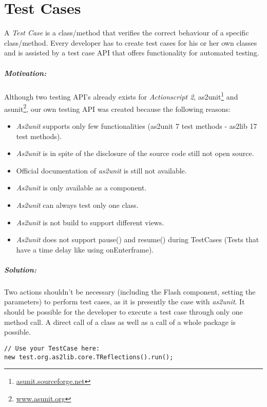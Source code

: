 \chapter{Test Cases}
\label{sec:TestCases}

A \emph{Test Case} is a class/method that verifies the correct behaviour of a specific class/method. Every developer has to create test cases for his or her own classes and is assisted by a test case API that offers functionality for automated testing.

\paragraph{Motivation:}
Although two testing API's already exists for {\sl Actionscript 2}, as2unit\footnote{\href{http://www.as2unit.org}{asunit.sourceforge.net}} and asunit\footnote{\href{http://asunit.sourceforge.net}{www.asunit.org}}, our own testing API was created because the following reasons:

\begin{itemize}
	\item {\sl As2unit} supports only few functionalities (as2unit 7 test methods - as2lib 17 test methods).
	\item {\sl As2unit} is in spite of the disclosure of the source code still not open source.
	\item Official documentation of {\sl as2unit} is still not available.
	\item {\sl As2unit} is only available as a component.
	\item {\sl As2unit} can always test only one class.
	\item {\sl As2unit} is not build to support different views. 
	\item {\sl As2unit} does not support pause() and resume() during TestCases (Tests that have a time delay like using onEnterframe). 
\end{itemize} 

\paragraph{Solution:}

Two actions shouldn't be necessary (including the Flash component, setting the parameters) to perform test cases, as it is presently the case with {\sl as2unit}. It should be possible for the developer to execute a test case through only one method call. A direct call of a class as well as a call of a whole package is possible. 
\clearpage
\begin{lstlisting}[frame=single]
// Use your TestCase here:
new test.org.as2lib.core.TReflections().run();
\end{lstlisting}

